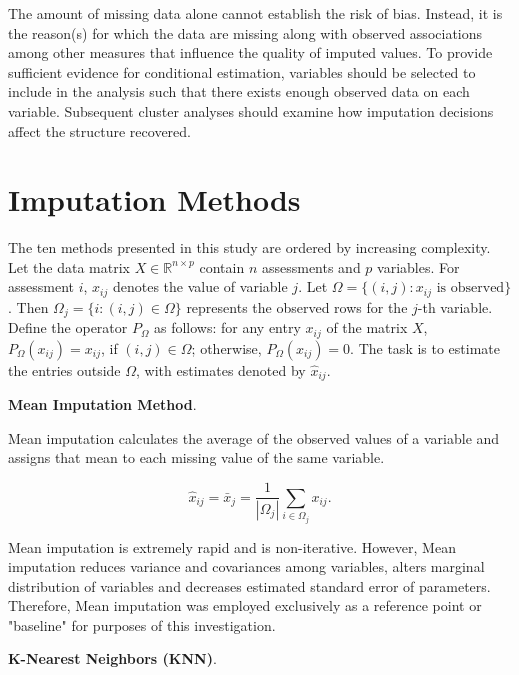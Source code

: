 The amount of missing data alone cannot establish the risk of bias. Instead, it is the reason(s) for which the data are missing along with observed associations among other measures that influence the quality of imputed values. To provide sufficient evidence for conditional estimation, variables should be selected to include in the analysis such that there exists enough observed data on each variable. Subsequent cluster analyses should examine how imputation decisions affect the structure recovered.

\section{Imputation Methods}\label{sec:lit_imputation}
The ten methods presented in this study are ordered by increasing complexity. Let the data matrix $X \in \mathbb{R}^{n \times p}$ contain \(n\) assessments and \(p\) variables. For assessment \(i\), $x_{ij}$ denotes the value of variable \(j\). Let $\Omega = \{(i, j): x_{ij} \text{ is observed}\}$. Then $\Omega_j = \{i : (i, j) \in \Omega\}$ represents the observed rows for the \(j\)-th variable. Define the operator $P_\Omega$ as follows: for any entry $x_{ij}$ of the matrix $X$, $P_\Omega(x_{ij}) = x_{ij}$, if $(i,j) \in \Omega$; otherwise, $P_\Omega(x_{ij}) = 0$. The task is to estimate the entries outside $\Omega$, with estimates denoted by $\hat{x}_{ij}$.

\par\medskip
\noindent\textbf{Mean Imputation Method}.\par\nobreak

Mean imputation calculates the average of the observed values of a variable and assigns that mean to each missing value of the same variable.

\begin{equation}\label{eq:mean}
\hat{x}_{ij}=\bar{x}_j=\frac{1}{|\Omega_j|}\sum_{i\in\Omega_j}x_{ij}.
\end{equation}

Mean imputation is extremely rapid and is non-iterative. However, Mean imputation reduces variance and covariances among variables, alters marginal distribution of variables and decreases estimated standard error of parameters. Therefore, Mean imputation was employed exclusively as a reference point or "baseline" for purposes of this investigation.

\par\medskip
\noindent\textbf{K-Nearest Neighbors (KNN)}.\par\nobreak

